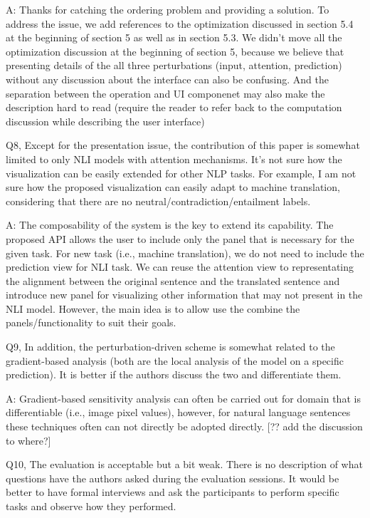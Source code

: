 A: Thanks for catching the ordering problem and providing a solution. To address the issue, we add references to the optimization discussed in section 5.4 at the beginning of section 5 as well as in section 5.3. We didn't move all the optimization discussion at the beginning of section 5, because we believe that presenting details of the all three perturbations (input, attention, prediction) without any discussion about the interface can also be confusing. And the separation between the operation and UI componenet may also make the description hard to read (require the reader to refer back to the computation discussion while describing the user interface)

Q8, Except for the presentation issue, the contribution of this paper is somewhat limited to only NLI models with attention mechanisms. It's not sure how the visualization can be easily extended for other NLP tasks. For example, I am not sure how the proposed visualization can easily adapt to machine translation, considering that there are no neutral/contradiction/entailment labels.

A: The composability of the system is the key to extend its capability. The proposed API allows the user to include only the panel that is necessary for the given task. For new task (i.e., machine translation), we do not need to include the prediction view for NLI task. We can reuse the attention view to representating the alignment between the original sentence and the translated sentence and introduce new panel for visualizing other information that may not present in the NLI model. However, the main idea is to allow use the combine the panels/functionality to suit their goals.

Q9, In addition, the perturbation-driven scheme is somewhat related to the gradient-based analysis (both are the local analysis of the model on a specific prediction). It is better if the authors discuss the two and differentiate them.

A: Gradient-based sensitivity analysis can often be carried out for domain that is differentiable (i.e., image pixel values), however, for natural language sentences these techniques often can not directly be adopted directly. [?? add the discussion to where?]

Q10, The evaluation is acceptable but a bit weak. There is no description of what questions have the authors asked during the evaluation sessions. It would be better to have formal interviews and ask the participants to perform specific tasks and observe how they performed.

